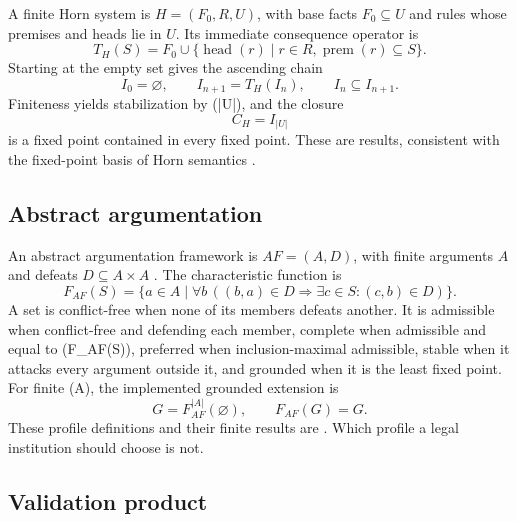 A finite Horn system is $H=(F_0,R,U)$, with base facts $F_0\subseteq U$ and rules whose premises and heads lie in $U$. Its immediate consequence operator is
\begin{equation}
T_H(S)=F_0\cup
\{\operatorname{head}(r)\mid r\in R,
\operatorname{prem}(r)\subseteq S\}.
\label{eq:horn-operator}
\end{equation}
Starting at the empty set gives the ascending chain
\begin{equation}
I_0=\varnothing,\qquad I_{n+1}=T_H(I_n),\qquad I_n\subseteq I_{n+1}.
\label{eq:horn-iteration}
\end{equation}
Finiteness yields stabilization by (|U|), and the closure
\begin{equation}
C_H=I_{|U|}
\label{eq:horn-closure}
\end{equation}
is a fixed point contained in every fixed point. These are \formalized{} results, consistent with the fixed-point basis of Horn semantics \citep{Horn1951,Tarski1955,CousotCousot1977}.

\subsection{Abstract argumentation}

An abstract argumentation framework is $AF=(A,D)$, with finite arguments $A$ and defeats $D\subseteq A\times A$ \citep{Dung1995}. The characteristic function is
\begin{equation}
F_{AF}(S)=\{a\in A\mid
\forall b\,((b,a)\in D\Rightarrow
\exists c\in S:(c,b)\in D)\}.
\label{eq:dung-characteristic}
\end{equation}
A set is conflict-free when none of its members defeats another. It is admissible when conflict-free and defending each member, complete when admissible and equal to (F_{AF}(S)), preferred when inclusion-maximal admissible, stable when it attacks every argument outside it, and grounded when it is the least fixed point. For finite (A), the implemented grounded extension is
\begin{equation}
G=F_{AF}^{|A|}(\varnothing),\qquad F_{AF}(G)=G.
\label{eq:grounded}
\end{equation}
These profile definitions and their finite results are \formalized{}. Which profile a legal institution should choose is not.

\subsection{Validation product}

